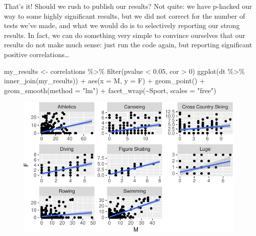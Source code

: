 \documentclass[
  letterpaper,
  DIV=11,
  numbers=noendperiod]{scrreprt}
\newenvironment{Shaded}{\begin{snugshade}}{\end{snugshade}}
\newcommand{\AttributeTok}[1]{\textcolor[rgb]{0.40,0.45,0.13}{#1}}
\newcommand{\DecValTok}[1]{\textcolor[rgb]{0.68,0.00,0.00}{#1}}
\newcommand{\FloatTok}[1]{\textcolor[rgb]{0.68,0.00,0.00}{#1}}
\newcommand{\FunctionTok}[1]{\textcolor[rgb]{0.28,0.35,0.67}{#1}}
\newcommand{\NormalTok}[1]{\textcolor[rgb]{0.00,0.23,0.31}{#1}}
\newcommand{\OtherTok}[1]{\textcolor[rgb]{0.00,0.23,0.31}{#1}}
\newcommand{\SpecialCharTok}[1]{\textcolor[rgb]{0.37,0.37,0.37}{#1}}
\newcommand{\StringTok}[1]{\textcolor[rgb]{0.13,0.47,0.30}{#1}}
\begin{document}
That's it! Should we rush to publish our results? Not quite: we have
p-hacked our way to some highly significant results, but we did not
correct for the number of tests we've made, and what we would do is to
selectively reporting our strong results. In fact, we can do something
very simple to convince ourselves that our results do not make much
sense: just run the code again, but reporting significant positive
correlations\ldots{}

\begin{Shaded}
\begin{Highlighting}[]
\NormalTok{my\_results }\OtherTok{\textless{}{-}}\NormalTok{ correlations }\SpecialCharTok{\%\textgreater{}\%} \FunctionTok{filter}\NormalTok{(pvalue }\SpecialCharTok{\textless{}} \FloatTok{0.05}\NormalTok{, cor }\SpecialCharTok{\textgreater{}} \DecValTok{0}\NormalTok{)}
\FunctionTok{ggplot}\NormalTok{(dt }\SpecialCharTok{\%\textgreater{}\%} \FunctionTok{inner\_join}\NormalTok{(my\_results)) }\SpecialCharTok{+} 
  \FunctionTok{aes}\NormalTok{(}\AttributeTok{x =} \StringTok{\textasciigrave{}}\AttributeTok{M}\StringTok{\textasciigrave{}}\NormalTok{, }\AttributeTok{y =} \StringTok{\textasciigrave{}}\AttributeTok{F}\StringTok{\textasciigrave{}}\NormalTok{) }\SpecialCharTok{+} 
  \FunctionTok{geom\_point}\NormalTok{() }\SpecialCharTok{+} 
  \FunctionTok{geom\_smooth}\NormalTok{(}\AttributeTok{method =} \StringTok{"lm"}\NormalTok{) }\SpecialCharTok{+} 
  \FunctionTok{facet\_wrap}\NormalTok{(}\SpecialCharTok{\textasciitilde{}}\NormalTok{Sport, }\AttributeTok{scales =} \StringTok{"free"}\NormalTok{)}
\end{Highlighting}
\end{Shaded}

\begin{figure}[H]

{\centering \includegraphics{./05-hypothesis_files/figure-pdf/unnamed-chunk-17-1.pdf}

}

\end{figure}
\end{document}
